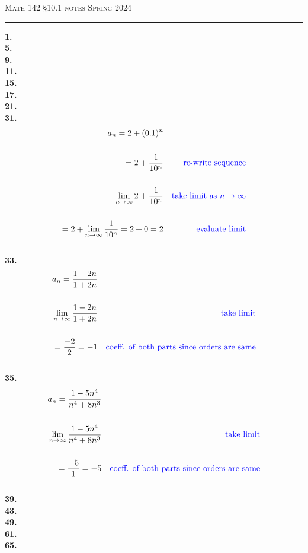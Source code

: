 \documentclass{article}
\begin{document}
\noindent
{\scshape Math 142} \hfill {\scshape \S10.1 notes} \hfill {\scshape Spring 2024}

\smallskip

\hrule

\bigskip

\noindent
\textbf{
1.
}
\\

\noindent
\textbf{
5.
}
\\

\noindent
\textbf{
9.
}
\\

\noindent
\textbf{
11.
}
\\

\noindent
\textbf{
15.
}
\\

\noindent
\textbf{
17.
}
\\

\noindent
\textbf{
21.
}
\\

\noindent
\textbf{
31.
}
\begin{align*}
a_n=2+(0.1)^n
\\
\\
=2+\frac{1}{10^n}
&
&
\text{\color{blue} re-write sequence}
\\
\\
\lim_{n \to \infty}
2+\frac{1}{10^n}
&
&
\text{\color{blue} take limit as $n \to \infty$}
\\
\\
=2+\lim_{n \to \infty} \frac{1}{10^n}
=2+0
=2
&
&
\text{\color{blue} evaluate limit}
\end{align*}
\\

\noindent
\textbf{
33.
}
\begin{align*}
a_n=\frac{1-2n}{1+2n}
\\
\\
\lim_{n \to \infty} \frac{1-2n}{1+2n}
&
&
\text{\color{blue} take limit}
\\
\\
=\frac{-2}{2}=-1
&
&
\text{\color{blue} coeff. of both parts since orders are same}
\end{align*}
\\

\noindent
\textbf{
35.
}
\begin{align*}
a_n=\frac{1-5n^4}{n^4+8n^3}
\\
\\
\lim_{n \to \infty} \frac{1-5n^4}{n^4+8n^3}
&
&
\text{\color{blue} take limit}
\\
\\
=\frac{-5}{1}=-5
&
&
\text{\color{blue} coeff. of both parts since orders are same}
\end{align*}
\\

\noindent
\textbf{
39.
}
\\

\noindent
\textbf{
43.
}
\\

\noindent
\textbf{
49.
}
\\

\noindent
\textbf{
61.
}
\\

\noindent
\textbf{
65.
}
\\
\end{document}
